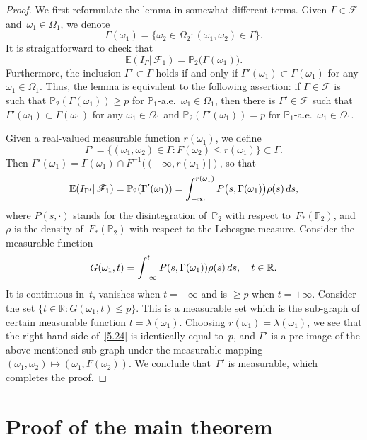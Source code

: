 \documentclass[11pt]{article}
\theoremstyle{plain}
\theoremstyle{definition}
\let\mathcal\mathscr
\theoremstyle{plain}
\numberwithin{equation}{section}
\newcommand{\dd}{{\textup d}}
\newcommand{\R}{{\mathbb R}}
\newcommand{\IP}{{\mathbb P}}
\newcommand{\E}{{\mathbb E}}
\newcommand{\FF}{{\mathcal F}}
\begin{document}
\begin{proof}
We first reformulate the lemma in somewhat different terms. Given $\Gamma\in\FF$ and~$\omega_1\in\Omega_1$, we denote
\[
\Gamma(\omega_1)
=\{\omega_2\in\Omega_2:(\omega_1,\omega_2)\in\Gamma\}.
\]
It is straightforward to check that
\[
\E(I_\Gamma|\,\FF_1)=\IP_2\bigl(\Gamma(\omega_1)\bigr).
\]
Furthermore, the inclusion $\Gamma'\subset\Gamma$ holds if and only if $\Gamma'(\omega_1)\subset\Gamma(\omega_1)$ for any $\omega_1\in\Omega_1$. Thus, the lemma is equivalent to the following assertion: if $\Gamma\in\FF$ is such that $\IP_2(\Gamma(\omega_1))\ge p$ for $\IP_1$-a.e.\ $\omega_1\in\Omega_1$, then there is $\Gamma'\in\FF$ such that $\Gamma'(\omega_1)\subset\Gamma(\omega_1)$ for any $\omega_1\in\Omega_1$ and $\IP_2(\Gamma'(\omega_1))= p$ for $\IP_1$-a.e.\ $\omega_1\in\Omega_1$.

Given a real-valued measurable function $r(\omega_1)$, we define
\[
\Gamma'=\{(\omega_1,\omega_2)\in\Gamma:
F(\omega_2)\le r(\omega_1)\}\subset\Gamma.
\]
Then $\Gamma'(\omega_1)=\Gamma(\omega_1)\cap F^{-1}((-\infty,r(\omega_1)])$, so that
\begin{equation} \label{5.24}
\E(I_{\Gamma'}|\,\FF_1)=\IP_2(\Gamma'(\omega_1))
=\int_{-\infty}^{r(\omega_1)}
P\bigl(s,\Gamma(\omega_1)\bigr)\rho(s)\,\dd s,
\end{equation}
where $P(s,\cdot)$ stands for the disintegration of~$\IP_2$ with respect to~$F_*(\IP_2)$, and~$\rho$ is the density of~$F_*(\IP_2)$ with respect to the Lebesgue measure. Consider the measurable function
\[
G(\omega_1, t) = \int_{-\infty}^t P(s, \Gamma(\omega_1)) \rho(s)\,\dd s, \quad t\in\R.
\]
It is continuous in~$t$, vanishes when $t=-\infty$ and is $\ge p$ when $t=+\infty$. Consider the set $\{t\in \R:G(\omega_1,t)\le p\}$. This is a measurable set which is the sub-graph of certain measurable function $t=\lambda(\omega_1)$. Choosing $r(\omega_1) = \lambda(\omega_1)$, we see that the right-hand side of~\eqref{5.24} is identically equal to~$p$, and $\Gamma'$ is a pre-image of the above-mentioned sub-graph under the measurable mapping $(\omega_1, \omega_2)\mapsto (\omega_1, F(\omega_2))$. We conclude that~$\Gamma'$ is measurable, which completes the proof.
\end{proof}

\section{Proof of the main theorem}
\label{s3}
\end{document}
